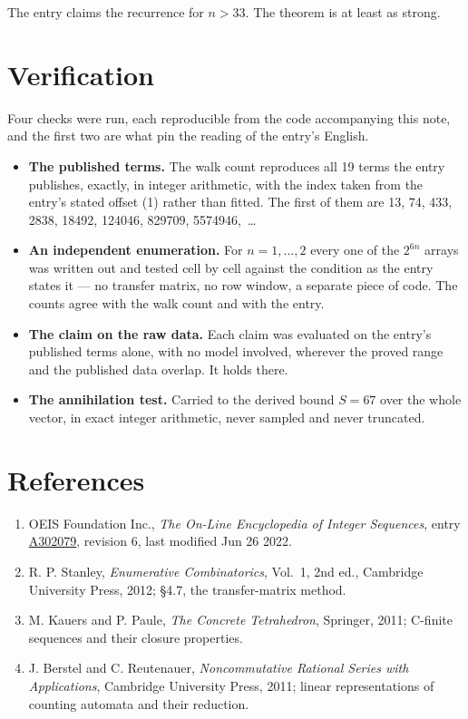 \documentclass[11pt]{article}
\theoremstyle{definition}
\begin{document}
The entry claims the recurrence for $n > 33$. The theorem is at least as strong.

\section{Verification}

Four checks were run, each reproducible from the code accompanying this note, and the first two are what pin the reading of the entry's English.

\begin{itemize}

\item {\bfseries The published terms.} The walk count reproduces all 19 terms the entry publishes, exactly, in integer arithmetic, with the index taken from the entry's stated offset (1) rather than fitted. The first of them are 13, 74, 433, 2838, 18492, 124046, 829709, 5574946,~\dots

\item {\bfseries An independent enumeration.} For $n = 1,\dots,2$ every one of the $2^{6n}$ arrays was written out and tested cell by cell against the condition as the entry states it --- no transfer matrix, no row window, a separate piece of code. The counts agree with the walk count and with the entry.

\item {\bfseries The claim on the raw data.} Each claim was evaluated on the entry's published terms alone, with no model involved, wherever the proved range and the published data overlap. It holds there.

\item {\bfseries The annihilation test.} Carried to the derived bound $S = 67$ over the whole vector, in exact integer arithmetic, never sampled and never truncated.

\end{itemize}

\section{References}

\begin{enumerate}

\item OEIS Foundation Inc., \emph{The On-Line Encyclopedia of Integer Sequences}, entry \href{https://oeis.org/A302079}{A302079}, revision 6, last modified Jun 26 2022.

\item R. P. Stanley, \emph{Enumerative Combinatorics}, Vol.~1, 2nd ed., Cambridge University Press, 2012; \S4.7, the transfer-matrix method.

\item M. Kauers and P. Paule, \emph{The Concrete Tetrahedron}, Springer, 2011; C-finite sequences and their closure properties.

\item J. Berstel and C. Reutenauer, \emph{Noncommutative Rational Series with Applications}, Cambridge University Press, 2011; linear representations of counting automata and their reduction.

\end{enumerate}
\end{document}
